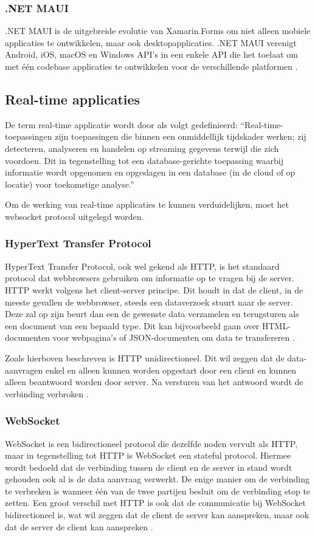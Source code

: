 \subsubsection{.NET MAUI}
.NET MAUI is de uitgebreide evolutie van Xamarin.Forms om niet alleen mobiele applicaties te ontwikkelen, maar ook desktopapplicaties. .NET MAUI verenigt Android, iOS, macOS en Windows API’s in een enkele API  die het toelaat om met één codebase applicaties te ontwikkelen voor de verschillende platformen \autocite{Britch2022}.

\subsection{Real-time applicaties}
De term real-time applicatie wordt door \textcite{Lutkevich2022} als volgt gedefinieerd:
“Real-time-toepassingen zijn toepassingen die binnen een onmiddellijk tijdskader werken; zij detecteren, analyseren en handelen op streaming gegevens terwijl die zich voordoen. Dit in tegenstelling tot een database-gerichte toepassing waarbij informatie wordt opgenomen en opgeslagen in een database (in de cloud of op locatie) voor toekomstige analyse.”

Om de werking van real-time applicaties te kunnen verduidelijken, moet het websocket protocol uitgelegd worden.

\subsubsection{HyperText Transfer Protocol}
HyperText Transfer Protocol, ook wel gekend als HTTP, is het standaard protocol dat webbrowsers gebruiken om informatie op te vragen bij de server. HTTP werkt volgens het client-server principe. Dit houdt in dat de client, in de meeste gevallen de webbrowser, steeds een dataverzoek stuurt naar de server. Deze zal op zijn beurt dan een de gewenste data verzamelen en terugsturen als een document van een bepaald type. Dit kan bijvoorbeeld gaan over HTML-documenten voor webpagina’s of JSON-documenten om data te transfereren \autocite{MDN2022}.

Zoals hierboven beschreven is HTTP unidirectioneel. Dit wil zeggen dat de data-aanvragen enkel en alleen kunnen worden opgestart door een client en kunnen alleen beantwoord worden door server. Na versturen van het antwoord wordt de verbinding verbroken \autocite{MDN2022}.

\subsubsection{WebSocket}
WebSocket is een bidirectioneel protocol die dezelfde noden vervult als HTTP, maar in tegenstelling tot HTTP is WebSocket een stateful protocol. Hiermee wordt bedoeld dat de verbinding tussen de client en de server in stand wordt gehouden ook al is de data aanvraag verwerkt. De enige manier om de verbinding te verbreken is wanneer één van de twee partijen besluit om de verbinding stop te zetten. Een groot verschil met HTTP is ook dat de communicatie bij WebSocket bidirectioneel is, wat wil zeggen dat de client de server kan aanspreken, maar ook dat de server de client kan aanspreken \autocite{GeeksforGeeks2022}.

